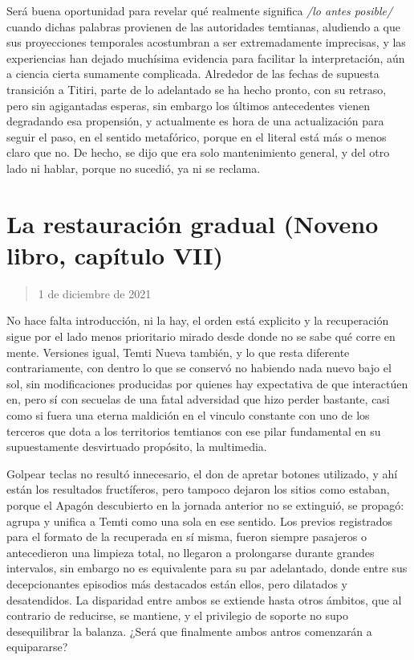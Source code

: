 \documentclass[
]{book}
\begin{document}
Será buena oportunidad para revelar qué realmente significa \emph{/lo antes posible/} cuando dichas palabras provienen de las autoridades temtianas, aludiendo a que sus proyecciones temporales acostumbran a ser extremadamente imprecisas, y las experiencias han dejado muchísima evidencia para facilitar la interpretación, aún a ciencia cierta sumamente complicada. Alrededor de las fechas de supuesta transición a Titiri, parte de lo adelantado se ha hecho pronto, con su retraso, pero sin agigantadas esperas, sin embargo los últimos antecedentes vienen degradando esa propensión, y actualmente es hora de una actualización para seguir el paso, en el sentido metafórico, porque en el literal está más o menos claro que no. De hecho, se dijo que era solo mantenimiento general, y del otro lado ni hablar, porque no sucedió, ya ni se reclama.

\hypertarget{la-restauraciuxf3n-gradual-noveno-libro-capuxedtulo-vii}{%
\section{La restauración gradual (Noveno libro, capítulo VII)}\label{la-restauraciuxf3n-gradual-noveno-libro-capuxedtulo-vii}}

\begin{quote}
1 de diciembre de 2021
\end{quote}

No hace falta introducción, ni la hay, el orden está explicito y la recuperación sigue por el lado menos prioritario mirado desde donde no se sabe qué corre en mente. Versiones igual, Temti Nueva también, y lo que resta diferente contrariamente, con dentro lo que se conservó no habiendo nada nuevo bajo el sol, sin modificaciones producidas por quienes hay expectativa de que interactúen en, pero sí con secuelas de una fatal adversidad que hizo perder bastante, casi como si fuera una eterna maldición en el vinculo constante con uno de los terceros que dota a los territorios temtianos con ese pilar fundamental en su supuestamente desvirtuado propósito, la multimedia.

Golpear teclas no resultó innecesario, el don de apretar botones utilizado, y ahí están los resultados fructíferos, pero tampoco dejaron los sitios como estaban, porque el Apagón descubierto en la jornada anterior no se extinguió, se propagó: agrupa y unifica a Temti como una sola en ese sentido. Los previos registrados para el formato de la recuperada en sí misma, fueron siempre pasajeros o antecedieron una limpieza total, no llegaron a prolongarse durante grandes intervalos, sin embargo no es equivalente para su par adelantado, donde entre sus decepcionantes episodios más destacados están ellos, pero dilatados y desatendidos. La disparidad entre ambos se extiende hasta otros ámbitos, que al contrario de reducirse, se mantiene, y el privilegio de soporte no supo desequilibrar la balanza. ¿Será que finalmente ambos antros comenzarán a equipararse?
\end{document}
